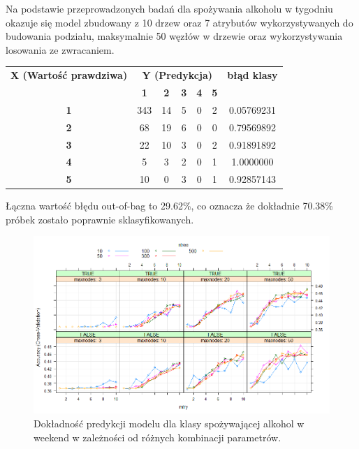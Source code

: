 
Na podstawie przeprowadzonych badań dla spożywania alkoholu w tygodniu okazuje się model zbudowany z 10 drzew oraz 7 atrybutów wykorzystywanych do  budowania podziału, maksymalnie 50 węzłów w drzewie oraz wykorzystywania losowania ze zwracaniem.

\begin{table}[h]
\begin{tabular}{|c|c|c|c|c|c|c|}
\hline
\multirow{}{}{\textbf{X (Wartość prawdziwa)}} & \multicolumn{5}{c|}{\textbf{Y (Predykcja)}}                                & \multirow{}{}{\textbf{błąd klasy}} \\ \cline{2-6}
                            & \textbf{1} & \textbf{2} & \textbf{3} & \textbf{4} & \textbf{5} &                                      \\ \hline
\textbf{1}                  & 343        & 14         & 5          & 0          & 2          & 0.05769231                           \\ \hline
\textbf{2}                  & 68         & 19         & 6          & 0          & 0          & 0.79569892                           \\ \hline
\textbf{3}                  & 22         & 10         & 3          & 0          & 2          & 0.91891892                           \\ \hline
\textbf{4}                  & 5          & 3          & 2          & 0          & 1          & 1.0000000                            \\ \hline
\textbf{5}                  & 10         & 0          & 3          & 0          & 1          & 0.92857143                           \\ \hline
\end{tabular}
\end{table}

Łączna wartość błędu out-of-bag to 29.62\%, co oznacza że dokładnie 70.38\% próbek zostało poprawnie sklasyfikowanych. 

\begin{figure}[h]
     \centering 
     \includegraphics[scale=0.60]{tex/customW_vol4.png}
     \caption{Dokładność predykcji modelu dla klasy spożywającej alkohol w weekend w zależności od różnych kombinacji parametrów.}
     \label{fig:classes}
\end{figure}


